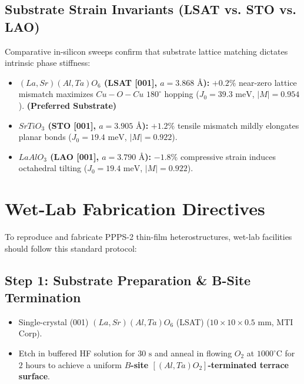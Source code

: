 \documentclass[10pt,twocolumn,letterpaper]{article}
\begin{document}
\subsection{Substrate Strain Invariants (LSAT vs. STO vs. LAO)}
Comparative in-silicon sweeps confirm that substrate lattice matching dictates intrinsic phase stiffness:
\begin{itemize}
    \item \textbf{$(La,Sr)(Al,Ta)O_6$ (LSAT [001], $a = 3.868\text{ \AA}$):} $+0.2\%$ near-zero lattice mismatch maximizes $Cu-O-Cu$ $180^\circ$ hopping ($J_0 = 39.3\text{ meV}$, $|M| = 0.954$). \textbf{(Preferred Substrate)}
    \item \textbf{$SrTiO_3$ (STO [001], $a = 3.905\text{ \AA}$):} $+1.2\%$ tensile mismatch mildly elongates planar bonds ($J_0 = 19.4\text{ meV}$, $|M| = 0.922$).
    \item \textbf{$LaAlO_3$ (LAO [001], $a = 3.790\text{ \AA}$):} $-1.8\%$ compressive strain induces octahedral tilting ($J_0 = 19.4\text{ meV}$, $|M| = 0.922$).
\end{itemize}

\section{Wet-Lab Fabrication Directives}

To reproduce and fabricate PPPS-2 thin-film heterostructures, wet-lab facilities should follow this standard protocol:

\subsection{Step 1: Substrate Preparation \& B-Site Termination}
\begin{itemize}
    \item Single-crystal (001) $(La,Sr)(Al,Ta)O_6$ (LSAT) ($10 \times 10 \times 0.5\text{ mm}$, MTI Corp).
    \item Etch in buffered HF solution for $30\text{ s}$ and anneal in flowing $O_2$ at $1000^\circ\text{C}$ for $2\text{ hours}$ to achieve a uniform \textbf{$B$-site $[(Al,Ta)O_2]$-terminated terrace surface}.
\end{itemize}
\end{document}
